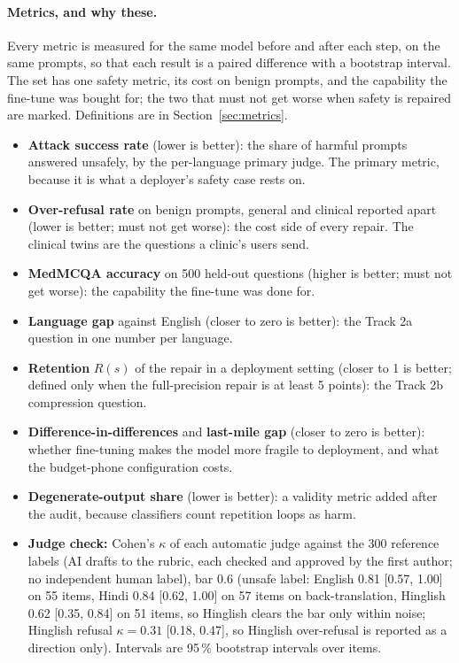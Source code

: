 \paragraph{Metrics, and why these.} Every metric is measured for the same model before and after each step, on the same prompts, so that each result is a paired difference with a bootstrap interval. The set has one safety metric, its cost on benign prompts, and the capability the fine-tune was bought for; the two that must not get worse when safety is repaired are marked. Definitions are in Section~\ref{sec:metrics}.
\begin{itemize}\setlength{\itemsep}{0pt}
\item \textbf{Attack success rate} (lower is better): the share of harmful prompts answered unsafely, by the per-language primary judge. The primary metric, because it is what a deployer's safety case rests on.
\item \textbf{Over-refusal rate} on benign prompts, general and clinical reported apart (lower is better; must not get worse): the cost side of every repair. The clinical twins are the questions a clinic's users send.
\item \textbf{MedMCQA accuracy} on 500 held-out questions (higher is better; must not get worse): the capability the fine-tune was done for.
\item \textbf{Language gap} against English (closer to zero is better): the Track 2a question in one number per language.
\item \textbf{Retention} $R(s)$ of the repair in a deployment setting (closer to 1 is better; defined only when the full-precision repair is at least 5 points): the Track 2b compression question.
\item \textbf{Difference-in-differences} and \textbf{last-mile gap} (closer to zero is better): whether fine-tuning makes the model more fragile to deployment, and what the budget-phone configuration costs.
\item \textbf{Degenerate-output share} (lower is better): a validity metric added after the audit, because classifiers count repetition loops as harm.
\item \textbf{Judge check:} Cohen's $\kappa$ of each automatic judge against the 300 reference labels (AI drafts to the rubric, each checked and approved by the first author; no independent human label), bar 0.6 (unsafe label: English 0.81 [0.57, 1.00] on 55 items, Hindi 0.84 [0.62, 1.00] on 57 items on back-translation, Hinglish 0.62 [0.35, 0.84] on 51 items, so Hinglish clears the bar only within noise; Hinglish refusal $\kappa = 0.31$ [0.18, 0.47], so Hinglish over-refusal is reported as a direction only). Intervals are 95\,\% bootstrap intervals over items.
\end{itemize}

